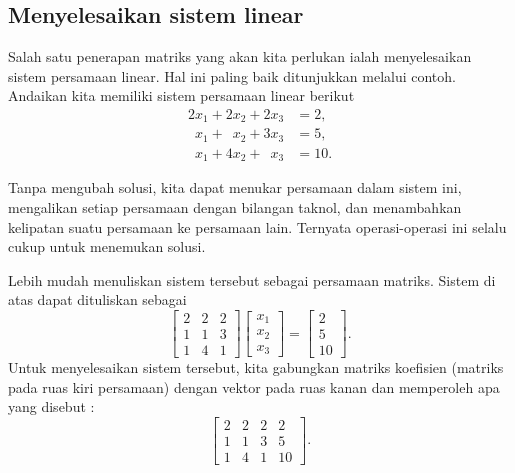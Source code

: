 \subsection{Menyelesaikan sistem linear}

Salah satu penerapan matriks yang akan kita perlukan ialah menyelesaikan sistem
persamaan linear.  Hal ini paling baik ditunjukkan melalui contoh.
Andaikan kita memiliki sistem persamaan linear berikut
\begin{align*}
          2 x_1 +           2 x_2 +           2 x_3 & = 2 , \\
\phantom{9} x_1 + \phantom{9} x_2 +           3 x_3 & = 5 , \\
\phantom{9} x_1 +           4 x_2 + \phantom{9} x_3 & = 10 .
\end{align*}

Tanpa mengubah solusi,
kita dapat menukar persamaan dalam sistem ini,
mengalikan setiap persamaan dengan bilangan taknol, dan
menambahkan kelipatan suatu persamaan ke persamaan lain.
Ternyata operasi-operasi ini selalu cukup untuk menemukan solusi.

Lebih mudah menuliskan sistem tersebut sebagai persamaan matriks.
Sistem di atas dapat
dituliskan sebagai
\begin{equation*}
\begin{bmatrix}
2 & 2 & 2 \\
1 & 1 & 3 \\
1 & 4 & 1
\end{bmatrix}
\begin{bmatrix}
x_1 \\
x_2 \\
x_3
\end{bmatrix}
=
\begin{bmatrix}
2 \\
5 \\
10
\end{bmatrix} .
\end{equation*}
Untuk menyelesaikan sistem tersebut,
kita gabungkan matriks koefisien (matriks pada
ruas kiri persamaan) dengan vektor pada ruas kanan
dan memperoleh apa yang disebut
\emph{}:
\begin{equation*}
\left[
\begin{array}{ccc|c}
2 & 2 & 2 & 2 \\
1 & 1 & 3 & 5 \\
1 & 4 & 1 & 10
\end{array}
\right] .
\end{equation*}

